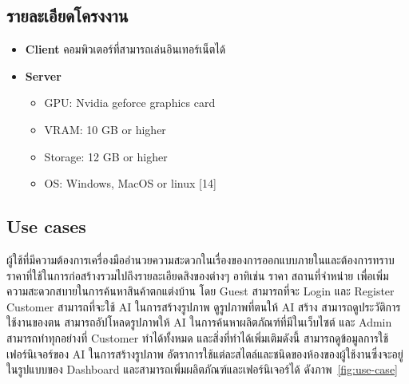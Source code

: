 \documentclass[12pt,oneside,openright,a4paper]{cpe-thai-project}
\begin{document}
\subsection{รายละเอียดโครงงาน}

\begin{itemize}
\item \textbf{Client} คอมพิวเตอร์ที่สามารถเล่นอินเทอร์เน็ตได้
\item \textbf{Server} 
\begin{itemize}
\item GPU: Nvidia geforce graphics card
\item VRAM: 10 GB or higher
\item Storage: 12 GB or higher
\item OS: Windows, MacOS or linux [14]
\end{itemize}
\end{itemize}

\subsection{Use cases}
\hspace {18pt}ผู้ใช้ที่มีความต้องการเครื่องมืออำนวยความสะดวกในเรื่องของการออกแบบภายในและต้องการทราบราคาที่ใช้ในการก่อสร้างรวมไปถึงรายละเอียดสิงของต่างๆ อาทิเช่น ราคา สถานที่จำหน่าย เพื่อเพิ่มความสะดวกสบายในการค้นหาสินค้าตกแต่งบ้าน โดย Guest สามารถที่จะ Login และ Register Customer สามารถที่จะใช้ AI ในการสร้างรูปภาพ ดูรูปภาพที่ตนให้ AI สร้าง สามารถดูประวัติการใช้งานของตน สามารถอัปโหลดรูปภาพให้ AI ในการค้นหาผลิตภัณฑ์ที่มีในเว็บไซต์ และ Admin สามารถทำทุกอย่างที่ Customer ทำได้ทั้งหมด และสิ่งที่ทำได้เพิ่มเติมดังนี้ สามารถดูข้อมูลการใช้เฟอร์นิเจอร์ของ AI ในการสร้างรูปภาพ อัตราการใช้แต่ละสไตล์และชนิดของห้องของผู้ใช้งานซึ่งจะอยู่ในรูปแบบของ Dashboard และสามารถเพิ่มผลิตภัณฑ์และเฟอร์นิเจอร์ได้ ดังภาพ~\ref{fig:use-case}
\end{document}
